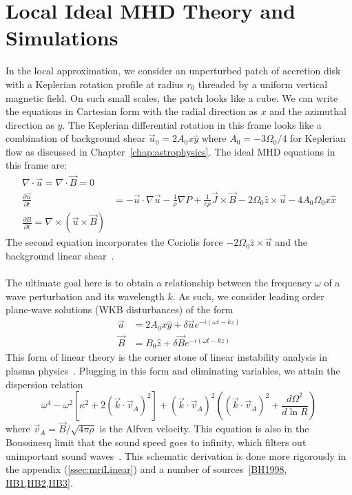 \section{Local Ideal MHD Theory and Simulations} \label{sec:localideal}
In the local approximation, we consider an unperturbed patch of accretion disk with a Keplerian rotation profile at radius $r_0$ threaded by a uniform vertical magnetic field. On such small scales, the patch looks like a cube. We can write the equations in Cartesian form with the radial direction as $x$ and the azimuthal direction as $y$. The Keplerian differential rotation in this frame looks like a combination of background shear $\vec u_0=2A_0x\hat y$ where $A_0=-3\Omega_0/4$ for Keplerian flow as discussed in Chapter~\ref{chap:astrophysics}. The ideal MHD equations in this frame are:
\begin{align}
  \nabla\cdot\vec u=\nabla\cdot\vec B=0\\
  \frac{\partial\vec u}{\partial t}&=-\vec u\cdot\nabla\vec u-\frac1\rho\nabla P+\frac{1}{c\rho}\vec J\times\vec B-2\Omega_0\hat z\times\vec u-4A_0\Omega_0x\hat x\\
  \frac{\partial B}{\partial t}=\nabla\times\left(\vec u\times\vec B\right)
\end{align}
The second equation incorporates the Coriolis force $-2\Omega_0\hat z\times\vec u$ and the background linear shear~\cite{AST521HW4}. \\
\\
The ultimate goal here is to obtain a relationship between the frequency $\omega$ of a wave perturbation and its wavelength $k$. As such, we consider leading order plane-wave solutions (WKB disturbances) of the form
\begin{align}
  \vec u&=2A_0x\hat y+\delta\vec ue^{-i(\omega t-kz)}\\
  \vec B&=B_0\hat z+\delta\vec Be^{-i(\omega t-kz)}
\end{align}
This form of linear theory is the corner stone of linear instability analysis in plasma physics~\cite{AST521HW4,BH1998,HB1,Quataert2008}. Plugging in this form and eliminating variables, we attain the dispersion relation
\begin{equation}
  \omega^4-\omega^2[\kappa^2+2(\vec k\cdot \vec v_A)^2]+(\vec k\cdot\vec v_A)^2\left((\vec k\cdot \vec v_A)^2+\frac{d\Omega^2}{d\ln R}\right)\label{eq:idealdispersion}
\end{equation}
where $\vec v_A=\vec B/\sqrt{4\pi\rho}$ is the Alfven velocity. This equation is also in the Boussinesq limit that the sound speed goes to infinity, which filters out unimportant sound waves~\cite{BH1998,KunzBoussinesq}. This schematic derivation is done more rigorously in the appendix (\ref{ssec:mriLinear}) and a number of sources~\ref{BH1998, HB1,HB2,HB3}.

